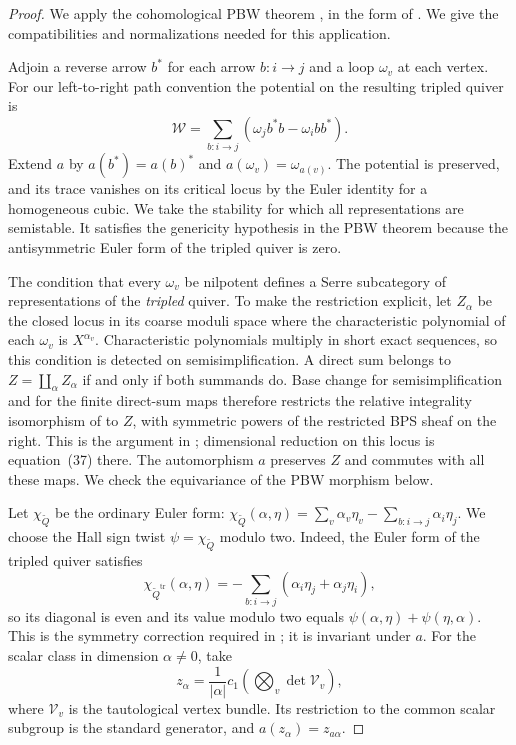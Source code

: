 \documentclass[11pt, reqno]{amsart}
\numberwithin{equation}{section}
\theoremstyle{definition}
\theoremstyle{remark}
\newcommand{\mr}[1]{\mathrm{#1}}
\newcommand{\mc}[1]{\mathcal{#1}}
\newcommand{\Qbar}{\widetilde Q}
\begin{document}
\begin{proof}
We apply the cohomological PBW theorem
\cite[Theorem~C]{DM}, in the form of
\cite[Section~3.4.2 and Theorem~3.11]{DavisonStacks}. We give the
compatibilities and normalizations needed for this application.

Adjoin a reverse arrow $b^*$ for each arrow $b:i\to j$ and a loop
$\omega_v$ at each vertex. For our left-to-right path convention the
potential on the resulting tripled quiver is
\[ \mc W=\sum_{b:i\to j}(\omega_jb^*b-\omega_i bb^*). \]
Extend $a$ by $a(b^*)=a(b)^*$ and $a(\omega_v)=\omega_{a(v)}$.
The potential is preserved, and its trace vanishes on its critical
locus by the Euler identity for a homogeneous cubic. We take the
stability for which all representations are semistable. It satisfies
the genericity hypothesis in the PBW theorem because the
antisymmetric Euler form of the tripled quiver is zero.

The condition that every $\omega_v$ be nilpotent defines a Serre
subcategory of representations of the \emph{tripled} quiver. To make
the restriction explicit, let $Z_\alpha$ be the closed locus in its
coarse moduli space where the characteristic polynomial of each
$\omega_v$ is $X^{\alpha_v}$. Characteristic polynomials multiply in
short exact sequences, so this condition is detected on
semisimplification. A direct sum belongs to $Z=\coprod_\alpha Z_\alpha$
if and only if both summands do. Base change for semisimplification
and for the finite direct-sum maps therefore restricts the relative
integrality isomorphism of
\cite[Theorem~3.9, equation~(22)]{DavisonStacks} to $Z$, with symmetric
powers of the restricted BPS sheaf on the right. This is the argument
in \cite[proof of Lemma~4.2, equation~(35)]{DavisonStacks}; dimensional
reduction on this locus is equation~(37) there. The automorphism $a$
preserves $Z$ and commutes with all these maps. We check the
equivariance of the PBW morphism below.


Let $\chi_{\Qbar}$ be the ordinary Euler form:
$\chi_{\Qbar}(\alpha,\eta)=\sum_v\alpha_v\eta_v-\sum_{b:i\to j}\alpha_i\eta_j$.
We choose the Hall sign twist $\psi=\chi_{\Qbar}$ modulo two. Indeed,
the Euler form of the tripled quiver satisfies
\[ \chi_{\Qbar^{\mr{tr}}}(\alpha,\eta) =-\sum_{b:i\to j}(\alpha_i\eta_j+\alpha_j\eta_i), \]
so its diagonal is even and its value modulo two equals
$\psi(\alpha,\eta)+\psi(\eta,\alpha)$. This is the symmetry correction
required in \cite[Theorem~C]{DM}; it is invariant under $a$.
For the scalar class in dimension $\alpha\ne0$, take
\[ z_\alpha=\frac1{|\alpha|} c_1\!\left(\bigotimes_v\det\mc V_v\right), \]
where $\mc V_v$ is the tautological vertex bundle. Its restriction
to the common scalar subgroup is the standard generator, and
$a(z_\alpha)=z_{a\alpha}$.


\end{proof}
\end{document}

